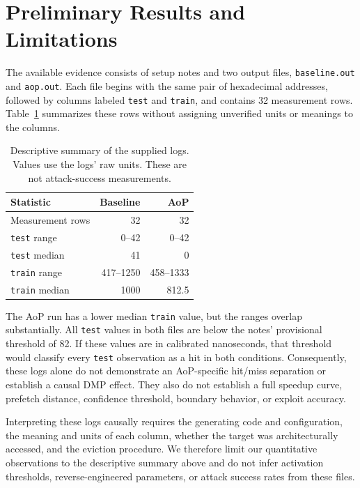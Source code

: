 \section{Preliminary Results and Limitations}
The available evidence consists of setup notes and two output files, \texttt{baseline.out} and \texttt{aop.out}. Each file begins with the same pair of hexadecimal addresses, followed by columns labeled \texttt{test} and \texttt{train}, and contains 32 measurement rows. Table~\ref{tab:logs} summarizes these rows without assigning unverified units or meanings to the columns.

\begin{table}[t]
\caption{Descriptive summary of the supplied logs. Values use the logs' raw units. These are not attack-success measurements.}
\label{tab:logs}
\centering
\begin{tabular}{lrr}
\toprule
Statistic & Baseline & AoP \\
\midrule
Measurement rows & 32 & 32 \\
\texttt{test} range & 0--42 & 0--42 \\
\texttt{test} median & 41 & 0 \\
\texttt{train} range & 417--1250 & 458--1333 \\
\texttt{train} median & 1000 & 812.5 \\
\bottomrule
\end{tabular}
\end{table}

The AoP run has a lower median \texttt{train} value, but the ranges overlap substantially. All \texttt{test} values in both files are below the notes' provisional threshold of 82. If these values are in calibrated nanoseconds, that threshold would classify every \texttt{test} observation as a hit in both conditions. Consequently, these logs alone do not demonstrate an AoP-specific hit/miss separation or establish a causal DMP effect. They also do not establish a full speedup curve, prefetch distance, confidence threshold, boundary behavior, or exploit accuracy.

Interpreting these logs causally requires the generating code and configuration, the meaning and units of each column, whether the target was architecturally accessed, and the eviction procedure. We therefore limit our quantitative observations to the descriptive summary above and do not infer activation thresholds, reverse-engineered parameters, or attack success rates from these files.
